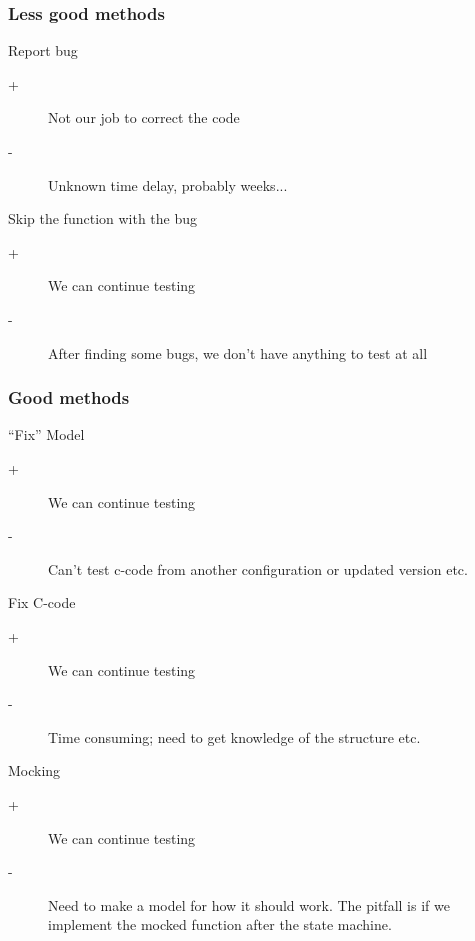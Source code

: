 \documentclass{beamer}
\begin{document}
\begin{frame}
  \frametitle{Less good methods}
  \begin{block}{Report bug}
    \begin{description}
      \item[+] Not our job to correct the code
      \item[-] Unknown time delay, probably weeks...
    \end{description}
  \end{block}

  \begin{block}{Skip the function with the bug}
    \begin{description}
      \item[+] We can continue testing
      \item[-] After finding some bugs, we don't have anything to test at all
    \end{description}
  \end{block}
\end{frame}


\begin{frame}
  \frametitle{Good methods}
  \begin{block}{``Fix'' Model}
    \begin{description}
      \item[+] We can continue testing
      \item[-] Can't test c-code from another configuration or updated version etc.
    \end{description}
  \end{block}

  \begin{block}{Fix C-code}
    \begin{description}
      \item[+] We can continue testing
      \item[-] Time consuming; need to get knowledge of the structure etc.
    \end{description}
  \end{block}

  \begin{block}{Mocking}
    \begin{description}
      \item[+] We can continue testing
      \item[-] Need to make a model for how it should work. The pitfall is if we
        implement the mocked function after the state machine.
    \end{description}
  \end{block}
\end{frame}
\end{document}
